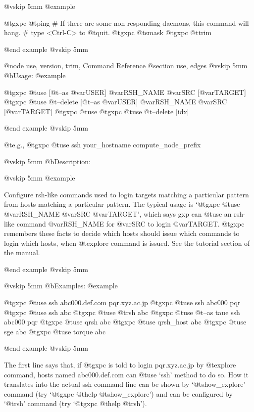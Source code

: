 @vskip 5mm
@example

  @t{gxpc} @t{ping}
  # If there are some non-responding daemons, this command will hang.
  # type <Ctrl-C> to @t{quit}.
  @t{gxpc} @t{smask}
  @t{gxpc} @t{trim}

@end example
@vskip 5mm

@node use, version, trim, Command Reference
@section use, edges
@vskip 5mm
@b{Usage:}
@example

  @t{gxpc} @t{use}          [@t{--as} @var{USER}] @var{RSH_NAME} @var{SRC} [@var{TARGET}]
  @t{gxpc} @t{use} @t{--delete} [@t{--as} @var{USER}] @var{RSH_NAME} @var{SRC} [@var{TARGET}]
  @t{gxpc} @t{use}
  @t{gxpc} @t{use} @t{--delete} [idx]

@end example
@vskip 5mm

  @t{e}.g.,
  @t{gxpc} @t{use} ssh your_hostname compute_node_prefix

@vskip 5mm
@b{Description:}



@vskip 5mm
@example

  Configure rsh-like commands used to login targets matching a
particular pattern from hosts matching a particular pattern. The
typical usage is `@t{gxpc} @t{use} @var{RSH_NAME} @var{SRC} @var{TARGET}', which says gxp can
@t{use} an rsh-like command @var{RSH_NAME} for @var{SRC} to login @var{TARGET}. @t{gxpc}
remembers these facts to decide which hosts should issue which
commands to login which hosts, when @t{explore} command is issued. See the
tutorial section of the manual.

@end example
@vskip 5mm

@vskip 5mm
@b{Examples:}
@example

  @t{gxpc} @t{use}           ssh abc000.def.com pqr.xyz.ac.jp
  @t{gxpc} @t{use}           ssh abc000 pqr
  @t{gxpc} @t{use}           ssh abc
  @t{gxpc} @t{use}           @t{rsh} abc
  @t{gxpc} @t{use} @t{--as} taue ssh abc000 pqr
  @t{gxpc} @t{use} qrsh      abc
  @t{gxpc} @t{use} qrsh_host abc
  @t{gxpc} @t{use} sge       abc
  @t{gxpc} @t{use} torque    abc

@end example
@vskip 5mm

The first line says that, if @t{gxpc} is told to login pqr.xyz.ac.jp by
@t{explore} command, hosts named abc000.def.com can @t{use} `ssh' method to do
so.  How it translates into the actual ssh command line can be shown
by `@t{show_explore}' command (try `@t{gxpc} @t{help} @t{show_explore}') and can be
configured by `@t{rsh}' command (try `@t{gxpc} @t{help} @t{rsh}').

